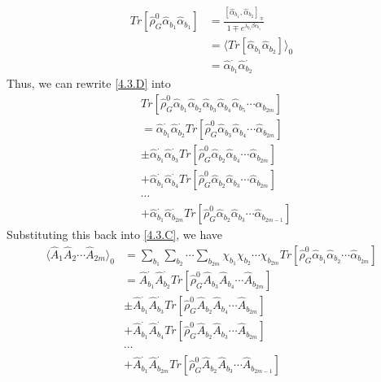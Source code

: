 \begin{equation}
\begin{aligned}
Tr[\hat{\rho}_G^0\hat\alpha_{b_1}\hat\alpha_{b_1}]&=\frac{[\hat\alpha_{b_1},\hat\alpha_{b_2}]_\mp}{1\mp e^{\lambda_{b_1}\beta e_{b_1}}}\\
&=\langle Tr[\hat\alpha_{b_1} \hat\alpha_{b_2}]\rangle_0\\
&=\hat\alpha_{b_1}^{\cdot}\hat\alpha_{b_2}^{\cdot}
\end{aligned}
\end{equation}
Thus, we can rewrite \ref{4.3.D} into
\begin{equation}
\begin{aligned}
&Tr[\hat{\rho}_G^0\hat \alpha_{b_1} \hat \alpha_{b_2} \hat \alpha_{b_3} \hat \alpha_{b_4} \hat \alpha_{b_5} \cdots \hat \alpha_{b_{2m}}]\\
&=\hat \alpha_{b_1}^\cdot \hat \alpha_{b_2}^\cdot Tr[\hat{\rho}_G^0 \hat \alpha_{b_3}\hat \alpha_{b_4}\cdots \hat \alpha_{b_{2m}}]\\
&\pm \hat \alpha_{b_1}^\cdot \hat \alpha_{b_3}^\cdot Tr[\hat{\rho}_G^0 \hat \alpha_{b_2}\hat \alpha_{b_4}\cdots \hat \alpha_{b_{2m}}]\\
&+\hat \alpha_{b_1}^\cdot \hat \alpha_{b_4}^\cdot Tr[\hat{\rho}_G^0 \hat \alpha_{b_2}\hat \alpha_{b_3}\cdots \hat \alpha_{b_{2m}}]\\
&\cdots\\
&+\hat \alpha_{b_1}^\cdot \hat \alpha_{b_{2m}}^{\cdot} Tr[\hat{\rho}_G^0 \hat \alpha_{b_2}\hat \alpha_{b_3}\cdots \hat \alpha_{b_{2m-1}}]
\end{aligned}
\end{equation}
Substituting this back into \ref{4.3.C}, we have
\begin{equation}
\begin{aligned}
\langle\hat A_1 \hat A_2 \cdots \hat A_{2m}\rangle_0&=\sum_{b_1}\sum_{b_2}\cdots\sum_{b_{2m}} \chi_{b_1}\chi_{b_2}\cdots\chi_{b_{2m}}Tr[\hat{\rho}_G^0\hat{\alpha}_{b_1} \hat{\alpha}_{b_2} \cdots \hat{\alpha}_{b_{2m}}]\\
&=\hat A_{b_1}^\cdot \hat A_{b_2}^\cdot Tr[\hat{\rho}_G^0 \hat A_{b_3}\hat A_{b_4}\cdots \hat A_{b_{2m}}]\\
&\pm \hat A_{b_1}^\cdot \hat A_{b_3}^\cdot Tr[\hat{\rho}_G^0 \hat A_{b_2}\hat A_{b_4}\cdots \hat A_{b_{2m}}]\\
&+\hat A_{b_1}^\cdot \hat A_{b_4}^\cdot Tr[\hat{\rho}_G^0 \hat A_{b_2}\hat A_{b_3}\cdots \hat A_{b_{2m}}]\\
&\cdots\\
&+\hat A_{b_1}^\cdot \hat A_{b_{2m}}^{\cdot} Tr[\hat{\rho}_G^0 \hat A_{b_2}\hat A_{b_3}\cdots \hat A_{b_{2m-1}}]
\end{aligned}
\end{equation}
